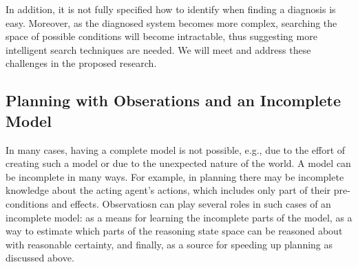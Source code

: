 \documentclass[12pt]{article}
\newcommand{\note}[1]{\textbf{\textit{#1}}}
\begin{document}
In addition, it is not fully specified how to identify when finding a diagnosis is easy. 
Moreover, as the diagnosed system becomes more complex, searching the space of possible conditions will become intractable, thus suggesting more intelligent search techniques are needed. We will meet and address these challenges in the proposed research.  





\subsection{Planning with Obserations and an Incomplete Model}

In many cases, having a complete model is not possible, e.g., due to the effort of creating such a model or due to the unexpected nature of the world. A model can be incomplete in many ways. For example, in planning there may be incomplete knowledge about the acting agent's actions, which includes only part of their pre-conditions and effects. Observatiosn can play several roles in such cases of an incomplete model: as a means for learning the incomplete parts of the model, as a way to estimate which parts of the reasoning state space can be reasoned about with reasonable certainty, and finally, as a source for speeding up planning as discussed above. 



\end{document}
